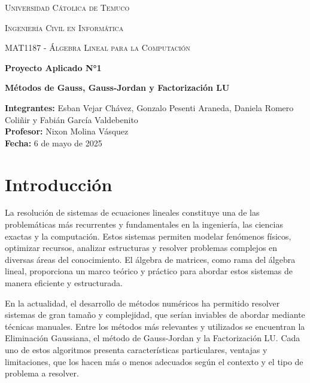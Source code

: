 \documentclass[12pt]{article}
\begin{document}
\begin{titlepage}
    \centering
    {\scshape\LARGE Universidad Cátolica de Temuco \par}
    {\scshape\Large Ingeniería Civil en Informática \par}
    {\scshape\Large MAT1187 - Álgebra Lineal para la Computación \par}
    \vspace{2cm}
    {\Huge\bfseries Proyecto Aplicado N°1 \par}
    \vspace{1cm}
    {\Large\bfseries Métodos de Gauss, Gauss-Jordan y Factorización LU \par}
    \vspace{2cm}
    \begin{flushleft}
        \textbf{Integrantes:} Esban Vejar Chávez, Gonzalo Pesenti Araneda, Daniela Romero Coliñir y Fabián García Valdebenito \\ 
        \textbf{Profesor:} Nixon Molina Vásquez \\ 
        \textbf{Fecha:} 6 de mayo de 2025
    \end{flushleft}
    \vfill
\end{titlepage}

\tableofcontents
\newpage

\section{Introducción}
La resolución de sistemas de ecuaciones lineales constituye una de las problemáticas más recurrentes y fundamentales en la ingeniería, las ciencias exactas y la computación. Estos sistemas permiten modelar fenómenos físicos, optimizar recursos, analizar estructuras y resolver problemas complejos en diversas áreas del conocimiento. El álgebra de matrices, como rama del álgebra lineal, proporciona un marco teórico y práctico para abordar estos sistemas de manera eficiente y estructurada.

En la actualidad, el desarrollo de métodos numéricos ha permitido resolver sistemas de gran tamaño y complejidad, que serían inviables de abordar mediante técnicas manuales. Entre los métodos más relevantes y utilizados se encuentran la Eliminación Gaussiana, el método de Gauss-Jordan y la Factorización LU. Cada uno de estos algoritmos presenta características particulares, ventajas y limitaciones, que los hacen más o menos adecuados según el contexto y el tipo de problema a resolver.
\end{document}
